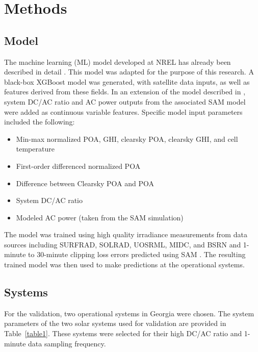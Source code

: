 \documentclass[conference]{IEEEtran}
\begin{document}
\section{Methods}

\subsection{Model}

The machine learning (ML) model developed at NREL has already been described in detail \cite{Anderson2020}. This model was adapted for the purpose of this research. A black-box XGBoost model was generated, with satellite data inputs, as well as features derived from these fields. In an extension of the model described in \cite{Anderson2020}, system DC/AC ratio and AC power outputs from the associated SAM model were added as continuous variable features. Specific model input parameters included the following:
\begin{itemize}
\item Min-max normalized POA, GHI, clearsky POA, clearsky GHI, and cell temperature
\item First-order differenced normalized POA
\item Difference between Clearsky POA and POA
\item System DC/AC ratio
\item Modeled AC power (taken from the SAM simulation) 
\end{itemize}
The model was trained using high quality irradiance measurements from data sources including SURFRAD, SOLRAD, UOSRML, MIDC, and BSRN \cite{Augustine2000} and 1-minute to 30-minute clipping loss errors predicted using SAM \cite{Freeman2018}. The resulting trained model was then used to make predictions at the operational systems.

\subsection{Systems}

For the validation, two operational systems in Georgia were chosen. The system parameters of the two solar systems used for validation are provided in Table~\ref{table1}. These systems were selected for their high DC/AC ratio and 1-minute data sampling frequency.
\end{document}
